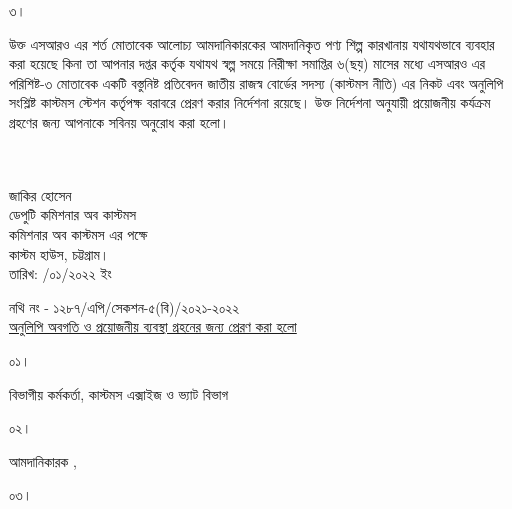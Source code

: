 \documentclass[12pt]{article}
\newcommand{\fileno}{নথি নং - ১২৮৭/এপি/সেকশন-৫(বি)/২০২১-২০২২}
\newcommand{\impn}{\jdwl}
\newcommand{\impadd}{\jdwla}
\newcommand{\rodt}{তারিখ: \hspace{2.0em}/০১/২০২২ ইং}
\begin{document}
\begin{minipage}[t]{.07\linewidth}
৩।
\end{minipage}
\begin{minipage}[t]{.93\linewidth}
উক্ত এসআরও এর শর্ত মোতাবেক
আলোচ্য আমদানিকারকের আমদানিকৃত পণ্য
শিল্প কারখানায় যথাযথভাবে ব্যবহার করা হয়েছে
কিনা তা আপনার দপ্তর কর্তৃক
যথাযথ স্বল্প সময়ে
নিরীক্ষা সমাপ্তির ৬(ছয়) মাসের মধ্যে এসআরও
এর পরিশিষ্ট-৩ মোতাবেক একটি বস্তুনিষ্ট
প্রতিবেদন জাতীয় রাজস্ব বোর্ডের সদস্য
(কাস্টমস নীতি) এর নিকট এবং অনুলিপি সংশ্লিষ্ট
কাস্টমস স্টেশন কর্তৃপক্ষ বরাবরে প্রেরণ করার
নির্দেশনা রয়েছে। উক্ত নির্দেশনা
অনুযায়ী প্রয়োজনীয় কর্যক্রম গ্রহণের জন্য
আপনাকে সবিনয় অনুরোধ করা হলো।
\\
\\
\\
\end{minipage}
\begin{minipage}[t]{0.60\linewidth}
\hspace{1em}
\end{minipage}
\begin{minipage}[t]{0.40\linewidth}
\begin{center}
জাকির হোসেন
\\
ডেপুটি কমিশনার অব কাস্টমস
\\
কমিশনার অব কাস্টমস এর পক্ষে
\\
কাস্টম হাউস, চট্টগ্রাম।
\\
\footnotesize{{\rodt}}
\vspace*{10MM}
\end{center}
\end{minipage}
\footnotesize{{\fileno}}
\\
\underline{\footnotesize{অনুলিপি অবগতি ও প্রয়োজনীয় ব্যবস্থা গ্রহনের জন্য প্রেরণ করা হলো}}
\\
\begin{minipage}[t]{0.06\linewidth}
\footnotesize{০১।}
\end{minipage}
\begin{minipage}[t]{0.94\linewidth}
বিভাগীয় কর্মকর্তা, কাস্টমস এক্সাইজ ও ভ্যাট বিভাগ
\end{minipage}
\begin{minipage}[t]{0.06\linewidth}
\footnotesize{০২।}
\end{minipage}
\begin{minipage}[t]{0.94\linewidth}
\footnotesize{
আমদানিকারক {\impn}, {\impadd}
}
\end{minipage}
\begin{minipage}[t]{0.06\linewidth}
\footnotesize{০৩।}
\end{minipage}
\end{document}
